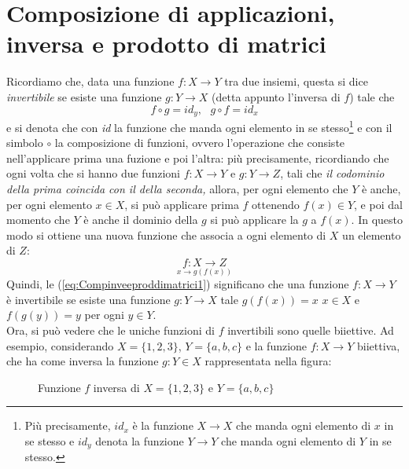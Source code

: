 \section{Composizione di applicazioni, inversa e prodotto di matrici}
\label{sec:Compinveeproddimatrici}

Ricordiamo che, data una funzione $f:X\to Y$ tra due insiemi, questa si
dice \textit{invertibile} se esiste una funzione $g:Y\to X$ (detta
appunto l'inversa di $f$) tale che
\begin{equation}
  \label{eq:Compinveeproddimatrici1}
  f \circ g=id_{y}, \text{ } g\circ f=id_{x}
\end{equation}
e si denota che con \textit{id} la funzione che manda ogni elemento in se
stesso\footnote{Più precisamente, $id_{x}$ è la funzione $X\to X$ che
  manda ogni elemento di $x$ in se stesso e $id_{y}$ denota la funzione
  $Y\to Y$ che manda ogni elemento di $Y$ in se stesso.} e con il simbolo
$\circ$ la composizione di funzioni, ovvero l'operazione che consiste
nell'applicare prima una fuzione e poi l'altra: più precisamente,
ricordiando che ogni volta che si hanno due funzioni $f:X\to Y$ e
$g:Y\to Z$, tali che \textit{il codominio della prima coincida con il
  della seconda,} allora, per ogni elemento che $Y$ è anche, per ogni
elemento $x\in X$, si può applicare prima $f$ ottenendo $f(x)\in Y$,
e poi dal momento che $Y$ è anche il dominio della $g$ si può applicare
la $g$ a $f(x)$. In questo modo si ottiene una nuova funzione che
associa a ogni elemento di $X$ un elemento di $Z$:
\begin{equation*}
  \underset{x\to g(f(x))}{f:X\to Z}
\end{equation*}
Quindi, le (\ref{eq:Compinveeproddimatrici1}) significano che una
funzione $f:X\to Y$ è invertibile se esiste una funzione $g:Y\to X$
tale $g(f(x))=x$ $x\in X$ e $f(g(y))=y$ per ogni $y\in Y$.\\
Ora, si può vedere che le uniche funzioni di $f$ invertibili sono
quelle biiettive. Ad esempio, considerando $X=\{1,2,3\}$, $Y=\{a,b,c\}$
e la funzione $f:X\to Y$ biiettiva, che ha come inversa la funzione
$g:Y\in X$ rappresentata nella figura:
\begin{figure}[ht!]
  \centering
  \resizebox{15cm}{!}{}
  \caption{Funzione $f$ inversa di $X=\{1,2,3\}$ e $Y=\{a,b,c\}$}
  \label{fig:Compinveeproddimatrici1}
\end{figure}

